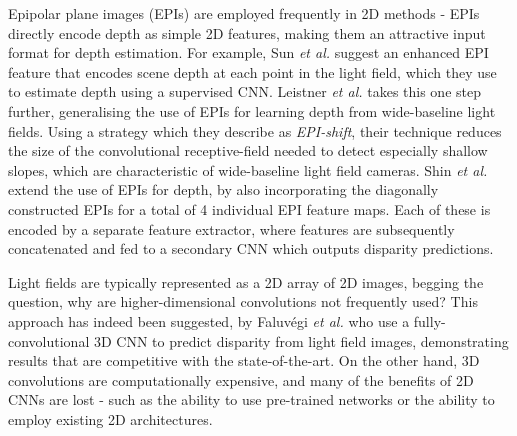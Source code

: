 Epipolar plane images (EPIs) are employed frequently in 2D methods - EPIs directly encode depth as simple 2D features, making them an attractive input format for depth estimation. For example, Sun \textit{et al.} \cite{sun2016lfdepthcnn} suggest an enhanced EPI feature that encodes scene depth at each point in the light field, which they use to estimate depth using a supervised CNN. Leistner \textit{et al.} \cite{leistner2019lfdepthcnn} takes this one step further, generalising the use of EPIs for learning depth from wide-baseline light fields. Using a strategy which they describe as \textit{EPI-shift}, their technique reduces the size of the convolutional receptive-field needed to detect especially shallow slopes, which are characteristic of wide-baseline light field cameras. Shin \textit{et al.} \cite{shin2018epinet} extend the use of EPIs for depth, by also incorporating the diagonally constructed EPIs for a total of 4 individual EPI feature maps. Each of these is encoded by a separate feature extractor, where features are subsequently concatenated and fed to a secondary CNN which outputs disparity predictions. 

Light fields are typically represented as a 2D array of 2D images, begging the question, why are higher-dimensional convolutions not frequently used? This approach has indeed been suggested, by Faluvégi \textit{et al.} \cite{faluvegi2019threedcnn} who use a fully-convolutional 3D CNN to predict disparity from light field images, demonstrating results that are competitive with the state-of-the-art. On the other hand, 3D convolutions are computationally expensive, and many of the benefits of 2D CNNs are lost - such as the ability to use pre-trained networks or the ability to employ existing 2D architectures. 

